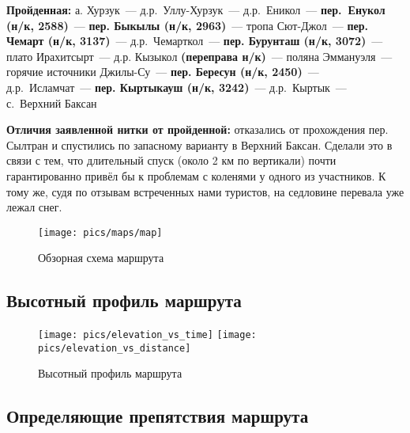 \textbf{Пройденная:} а. Хурзук~--- д.р.~Уллу-Хурзук~--- д.р.~Еникол~--- \textbf{пер.~Енукол (н/к, 2588)}~--- \textbf{пер. Быкылы (н/к, 2963)}~--- тропа Сют-Джол~--- \textbf{пер. Чемарт (н/к, 3137)}~--- д.р.~Чемарткол~--- \textbf{пер. Бурунташ (н/к, 3072)}~--- плато Ирахитсырт~--- д.р. Кызыкол \textbf{(переправа н/к)}~--- поляна Эммануэля~--- горячие источники Джилы-Су~--- \textbf{пер. Бересун (н/к, 2450)}~--- д.р.~Исламчат~---\textbf{ пер. Кыртыкауш (н/к, 3242)}~--- д.р.~Кыртык~--- с.~Верхний Баксан

\textbf{Отличия заявленной нитки от пройденной:} отказались от прохождения пер. Сылтран и спустились по запасному варианту в Верхний Баксан. Сделали это в связи с тем, что длительный спуск (около 2 км по вертикали) почти гарантированно привёл бы к проблемам с коленями у одного из участников. К тому же, судя по отзывам встреченных нами туристов, на седловине перевала уже лежал снег.

\begin{figure}[h!tbp]
  	\centering	\texttt{[image: pics/maps/map]}
	\caption{Обзорная схема маршрута}
\end{figure}

\newpage
\subsection{Высотный профиль маршрута}

\begin{figure}[h!]
	\centering
	\texttt{[image: pics/elevation\_vs\_time]}
	\texttt{[image: pics/elevation\_vs\_distance]}
	\caption{Высотный профиль маршрута}
	\label{fig:heights}
\end{figure}

\newpage
\subsection{Определяющие препятствия маршрута}

